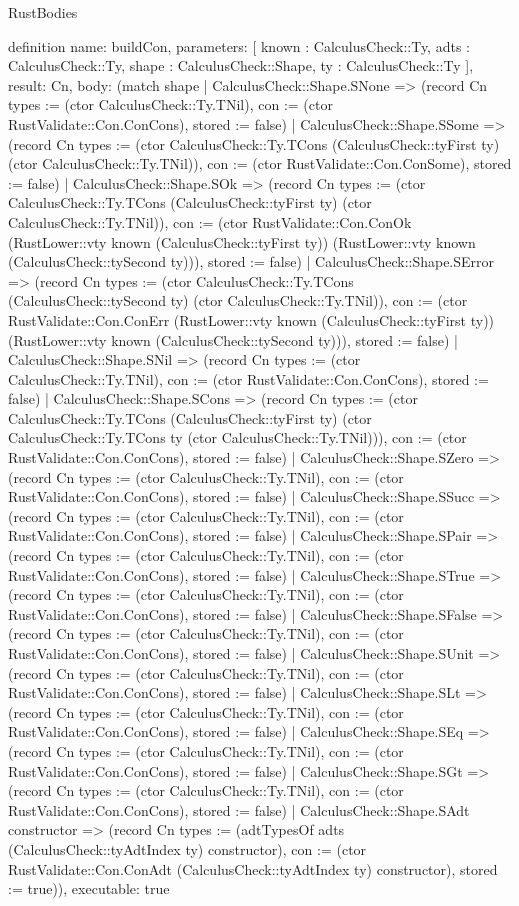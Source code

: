 \begin{lexlean}{RustBodies}
\begin{semanticmodule}
definition{
  name: buildCon,
  parameters: [
    known : CalculusCheck::Ty,
    adts : CalculusCheck::Ty,
    shape : CalculusCheck::Shape,
    ty : CalculusCheck::Ty
  ],
  result: Cn,
  body: (match shape
    | CalculusCheck::Shape.SNone => (record Cn {types := (ctor CalculusCheck::Ty.TNil), con := (ctor RustValidate::Con.ConCons), stored := false})
    | CalculusCheck::Shape.SSome => (record Cn {types := (ctor CalculusCheck::Ty.TCons (CalculusCheck::tyFirst ty) (ctor CalculusCheck::Ty.TNil)), con := (ctor RustValidate::Con.ConSome), stored := false})
    | CalculusCheck::Shape.SOk => (record Cn {types := (ctor CalculusCheck::Ty.TCons (CalculusCheck::tyFirst ty) (ctor CalculusCheck::Ty.TNil)), con := (ctor RustValidate::Con.ConOk (RustLower::vty known (CalculusCheck::tyFirst ty)) (RustLower::vty known (CalculusCheck::tySecond ty))), stored := false})
    | CalculusCheck::Shape.SError => (record Cn {types := (ctor CalculusCheck::Ty.TCons (CalculusCheck::tySecond ty) (ctor CalculusCheck::Ty.TNil)), con := (ctor RustValidate::Con.ConErr (RustLower::vty known (CalculusCheck::tyFirst ty)) (RustLower::vty known (CalculusCheck::tySecond ty))), stored := false})
    | CalculusCheck::Shape.SNil => (record Cn {types := (ctor CalculusCheck::Ty.TNil), con := (ctor RustValidate::Con.ConCons), stored := false})
    | CalculusCheck::Shape.SCons => (record Cn {types := (ctor CalculusCheck::Ty.TCons (CalculusCheck::tyFirst ty) (ctor CalculusCheck::Ty.TCons ty (ctor CalculusCheck::Ty.TNil))), con := (ctor RustValidate::Con.ConCons), stored := false})
    | CalculusCheck::Shape.SZero => (record Cn {types := (ctor CalculusCheck::Ty.TNil), con := (ctor RustValidate::Con.ConCons), stored := false})
    | CalculusCheck::Shape.SSucc => (record Cn {types := (ctor CalculusCheck::Ty.TNil), con := (ctor RustValidate::Con.ConCons), stored := false})
    | CalculusCheck::Shape.SPair => (record Cn {types := (ctor CalculusCheck::Ty.TNil), con := (ctor RustValidate::Con.ConCons), stored := false})
    | CalculusCheck::Shape.STrue => (record Cn {types := (ctor CalculusCheck::Ty.TNil), con := (ctor RustValidate::Con.ConCons), stored := false})
    | CalculusCheck::Shape.SFalse => (record Cn {types := (ctor CalculusCheck::Ty.TNil), con := (ctor RustValidate::Con.ConCons), stored := false})
    | CalculusCheck::Shape.SUnit => (record Cn {types := (ctor CalculusCheck::Ty.TNil), con := (ctor RustValidate::Con.ConCons), stored := false})
    | CalculusCheck::Shape.SLt => (record Cn {types := (ctor CalculusCheck::Ty.TNil), con := (ctor RustValidate::Con.ConCons), stored := false})
    | CalculusCheck::Shape.SEq => (record Cn {types := (ctor CalculusCheck::Ty.TNil), con := (ctor RustValidate::Con.ConCons), stored := false})
    | CalculusCheck::Shape.SGt => (record Cn {types := (ctor CalculusCheck::Ty.TNil), con := (ctor RustValidate::Con.ConCons), stored := false})
    | CalculusCheck::Shape.SAdt constructor => (record Cn {types := (adtTypesOf adts (CalculusCheck::tyAdtIndex ty) constructor), con := (ctor RustValidate::Con.ConAdt (CalculusCheck::tyAdtIndex ty) constructor), stored := true})),
  executable: true
}


\end{semanticmodule}
\end{lexlean}
